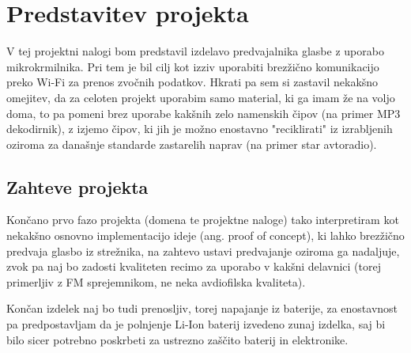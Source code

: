 \documentclass[12pt,a4paper,twoside,openright,slovene]{book}
\date{Ljubljana, Junij 2021}
\begin{document}
\frontmatter


\maketitle

\tableofcontents

\mainmatter




\chapter{Predstavitev projekta} \label{predstavitev}
V tej projektni nalogi bom predstavil izdelavo predvajalnika glasbe z uporabo mikrokrmilnika. Pri tem je bil cilj kot izziv uporabiti brezžično komunikacijo preko Wi-Fi za prenos zvočnih podatkov. Hkrati pa sem si zastavil nekakšno omejitev, da za celoten projekt uporabim samo material, ki ga imam že na voljo doma, to pa pomeni brez uporabe kakšnih zelo namenskih čipov (na primer MP3 dekodirnik), z izjemo čipov, ki jih je možno enostavno "reciklirati" iz izrabljenih oziroma za današnje standarde zastarelih naprav (na primer star avtoradio).



\section{Zahteve projekta}
Končano prvo fazo projekta (domena te projektne naloge) tako interpretiram kot nekakšno osnovno implementacijo ideje (ang. proof of concept), ki lahko brezžično predvaja glasbo iz strežnika, na zahtevo ustavi predvajanje oziroma ga nadaljuje, zvok pa naj bo zadosti kvaliteten recimo za uporabo v kakšni delavnici (torej primerljiv z FM sprejemnikom, ne neka avdiofilska kvaliteta).

Končan izdelek naj bo tudi prenosljiv, torej napajanje iz baterije, za enostavnost pa predpostavljam da je polnjenje Li-Ion baterij izvedeno zunaj izdelka, saj bi bilo sicer potrebno poskrbeti za ustrezno zaščito baterij in elektronike.
\end{document}
